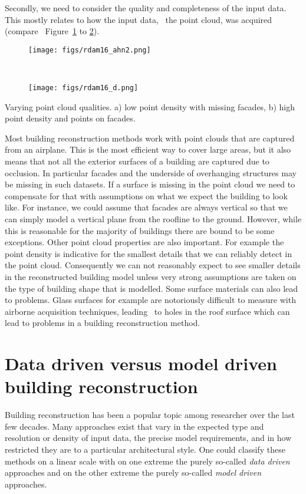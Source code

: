 Secondly, we need to consider the quality and completeness of the input data. This mostly relates to how the input data, \ie\ the point cloud, was acquired (compare \eg\ Figure~\ref{fig:pc-quality:low} to \ref{fig:pc-quality:high}).
\begin{marginfigure}
	\centering
	\begin{subfigure}{\linewidth}
		\texttt{[image: figs/rdam16\_ahn2.png]}
		\caption{}%
		\label{fig:pc-quality:low}
	\end{subfigure}
	\\
	\begin{subfigure}{\linewidth}
		\texttt{[image: figs/rdam16\_d.png]}
		\caption{}%
		\label{fig:pc-quality:high}
	\end{subfigure}
	\caption{Varying point cloud qualities. a) low point density with missing facades, b) high point density and points on facades.}%
	\label{fig:pc-quality}
\end{marginfigure}
Most building reconstruction methods work with point clouds that are captured from an airplane. 
This is the most efficient way to cover large areas, but it also means that not all the exterior surfaces of a building are captured due to occlusion. In particular facades and the underside of overhanging structures may be missing in such datasets. 
If a surface is missing in the point cloud we need to compensate for that with assumptions on what we expect the building to look like. 
For instance, we could assume that facades are always vertical so that we can simply model a vertical plane from the roofline to the ground. 
However, while this is reasonable for the majority of buildings there are bound to be some exceptions.
Other point cloud properties are also important. For example the point density is indicative for the smallest details that we can reliably detect in the point cloud. Consequently we can not reasonably expect to see smaller details in the reconstructed building model unless very strong assumptions are taken on the type of building shape that is modelled. Some surface materials can also lead to problems. Glass surfaces for example are notoriously difficult to measure with airborne acquisition techniques, leading \eg\ to holes in the roof surface which can lead to problems in a building reconstruction method.


%
\section{Data driven versus model driven building reconstruction}
Building reconstruction has been a popular topic among researcher over the last few decades. 
Many approaches exist that vary in the expected type and resolution or density of input data, the precise model requirements, and in how restricted they are to a particular architectural style.
One could classify these methods on a linear scale with on one extreme the purely so-called \emph{data  driven} approaches and on the other extreme the purely so-called \emph{model driven} approaches.

